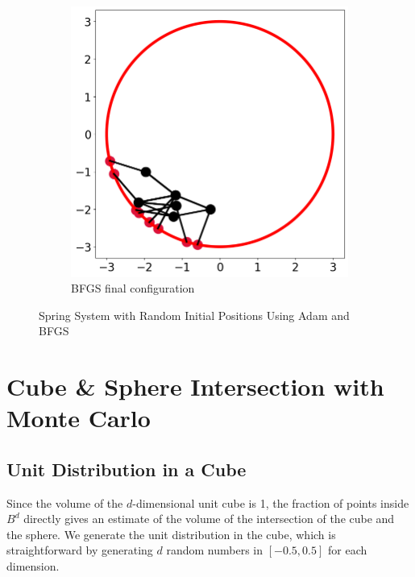 \documentclass[12pt]{article}
\newcommand{\0}{\boldsymbol{0}}
\begin{document}
\begin{figure}[h!]
\begin{subfigure}[b]{0.3\textwidth}
    \end{subfigure}
    \hfill
    \begin{subfigure}[b]{0.3\textwidth}
        \centering
        \includegraphics[width=\textwidth]{../img/problem_2/bfgs_random.png}
        \caption{BFGS final configuration}
        \label{fig:bfgs_config_random}
    \end{subfigure}
    \caption{Spring System with Random Initial Positions Using Adam and BFGS}
\end{figure}

\section{Cube \& Sphere Intersection with Monte Carlo}

\subsection{Unit Distribution in a Cube}

Since the volume of the $d$-dimensional unit cube is 1, the fraction of points inside $B^d$ directly gives an estimate of the volume of the intersection of the cube and the sphere. We generate the unit distribution in the cube, which is straightforward by generating $d$ random numbers in $\displaystyle\left[-0.5 ,0.5\right]$ for each dimension. 
\end{document}
